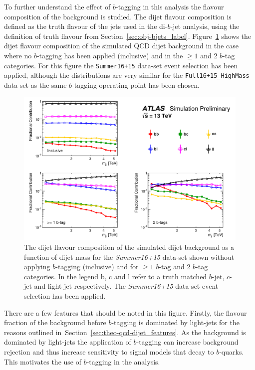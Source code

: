 To further understand the effect of $b$-tagging in this analysis the flavour composition of the background is studied.
The dijet flavour composition is defined as the truth flavour of the jets used in the di-$b$-jet analysis,
using the definition of truth flavour from Section~\ref{sec:obj-bjets_label}.
Figure~\ref{fig:evt-summer_flavcomp} shows the dijet flavour composition of the simulated QCD dijet background in
the case where no $b$-tagging has been applied (inclusive) and in the $\geq1$ and 2 $b$-tag categories.
For this figure the \verb|Summer16+15| data-set event selection has been applied,
although the distributions are very similar for the \verb|Full16+15_HighMass| data-set
as the same $b$-tagging operating point has been chosen.

\begin{figure}[!ht]
  \begin{center}
    \includegraphics[width=0.99\linewidth, angle=0]{figs/Dibjet/ICHEP/evt-summer_flavcomp.pdf}
  \end{center}
  \caption{The dijet flavour composition of the simulated dijet background as a function of dijet mass for the \textit{Summer16+15} data-set
    shown without applying $b$-tagging (inclusive) and for $\geq1$ $b$-tag and 2 $b$-tag categories.
    In the legend b, c and l refer to a truth matched $b$-jet, $c$-jet and light jet respectively.
    The \textit{Summer16+15} data-set event selection has been applied.}
  \label{fig:evt-summer_flavcomp}
\end{figure}

There are a few features that should be noted in this figure.
Firstly, the flavour fraction of the background before $b$-tagging is dominated by light-jets
for the reasons outlined in~Section~\ref{sec:theo-qcd-dijet_features}.
As the background is dominated by light-jets the application
of $b$-tagging can increase background rejection
and thus increase sensitivity to signal models that decay to $b$-quarks.
This motivates the use of $b$-tagging in the analysis.

